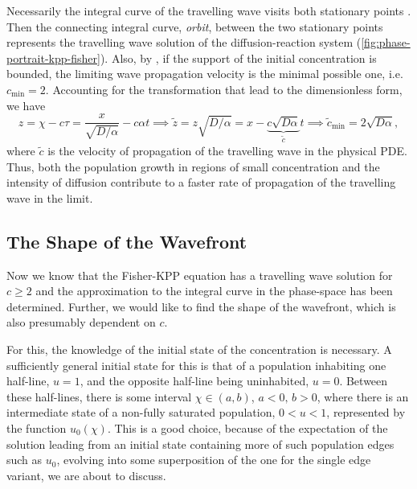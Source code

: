 Necessarily the integral curve of the travelling wave visits both stationary points \cite{kolmogorov1937a}.
Then the connecting integral curve, \emph{orbit}, between the two stationary points represents the travelling wave
solution of the diffusion-reaction system (\cref{fig:phase-portrait-kpp-fisher}).
Also, by \cite{kolmogorov1937a}, if the support of the initial concentration is bounded, the limiting wave propagation
    velocity is the minimal possible one, i.e.\@ \(c_{\text{min}} = 2\).
Accounting for the transformation that lead to the dimensionless form, we have \[
    z = \chi - c \tau = \frac{x}{\sqrt{D/\alpha}} - c\alpha t \implies \tilde{z} = z \sqrt{D/\alpha} = x - \underbrace{c \sqrt{D
    \alpha}}_{\tilde{c}} t \implies \tilde{c}_{\text{min}} = 2 \sqrt{D \alpha},
    \] where \(\tilde{c}\) is the velocity of propagation of the travelling wave in the physical \ac{PDE}.
Thus, both the population growth in regions of small concentration and the intensity of diffusion contribute to a faster 
    rate of propagation of the travelling wave in the limit.

\subsection{The Shape of the Wavefront}%
\label{sub:shape-of-wavefront}

Now we know that the Fisher-\ac{KPP} equation has a travelling wave solution for \(c \ge 2\) and the approximation to the
    integral curve in the phase-space has been determined.
Further, we would like to find the shape of the wavefront, which is also presumably dependent on \(c\).

For this, the knowledge of the initial state of the concentration is necessary.
A sufficiently general initial state for this is that of a population inhabiting one half-line, \(u = 1\), and the
    opposite half-line being uninhabited, \(u = 0\).
Between these half-lines, there is some interval \(\chi \in (a,b)\), \(a < 0,\, b > 0\), where there is an intermediate state of a non-fully saturated 
    population, \(0<u<1\), represented by the function \(u_0(\chi)\).
This is a good choice, because of the expectation of the solution leading from an initial state containing more of such 
    population edges such as \(u_0\), evolving into some superposition of the one for the single edge variant, we are
    about to discuss.



